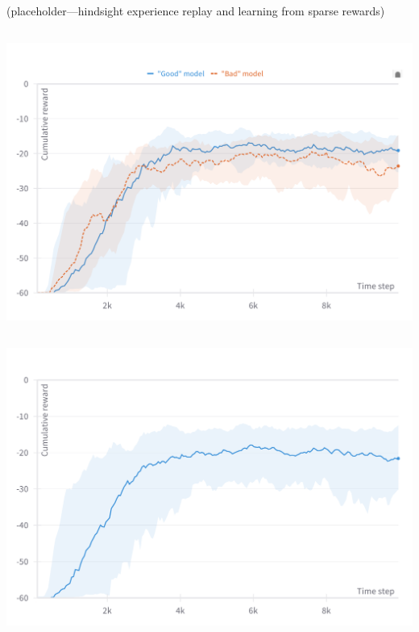 \documentclass[
  letterpaper,
  DIV=11,
  numbers=noendperiod,
  oneside]{scrartcl}
\begin{document}
\subsection{}\label{section-46}

(placeholder---hindsight experience replay and learning from sparse
rewards)

\subsection{}\label{section-47}

\begin{center}
\includegraphics{figs/reward_mass_HER.png}
\end{center}

\subsection{}\label{section-48}

\begin{center}
\includegraphics{figs/reward_mass_goodbad.png}
\end{center}
\end{document}
